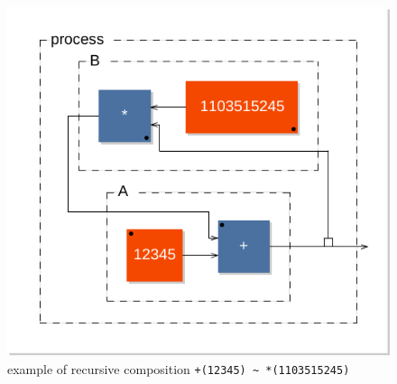 \documentclass[a4paper,10pt]{book}
\begin{document}
    \begin{figure}[h]
    \centering 
    \includegraphics[scale=0.7]{images/rec1} 
    \caption{example of recursive composition \lstinline'+(12345) ~ *(1103515245)'}  
    \label{figure:rec1}
    \end{figure}
 







\end{document}
